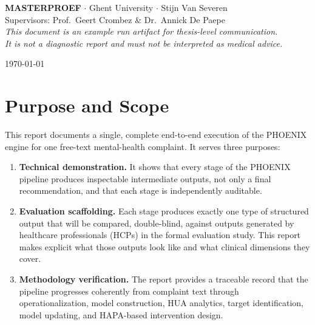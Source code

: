 \documentclass[11pt,a4paper]{article}
\begin{document}
\begin{titlepage}
\vfill
\begin{tcolorbox}[
  colback=PhoenixSoft,colframe=PhoenixBorder,
  width=0.78\textwidth,boxrule=0.5pt,arc=1.5mm,
  left=8pt,right=8pt,top=7pt,bottom=7pt
]
\small\centering
\textbf{MASTERPROEF} $\cdot$ Ghent University $\cdot$ Stijn Van Severen\\
Supervisors: Prof.\ Geert Crombez \& Dr.\ Annick De Paepe\\[0.3em]
\textit{This document is an example run artifact for thesis-level communication.\\
It is not a diagnostic report and must not be interpreted as medical advice.}
\end{tcolorbox}
\vspace{0.4cm}
{\large\today}
\end{titlepage}

\newpage
\tableofcontents
\newpage

\section{Purpose and Scope}

This report documents a single, complete end-to-end execution of the PHOENIX engine for one free-text mental-health complaint. It serves three purposes:

\begin{enumerate}
\item \textbf{Technical demonstration.} It shows that every stage of the PHOENIX pipeline produces inspectable intermediate outputs, not only a final recommendation, and that each stage is independently auditable.

\item \textbf{Evaluation scaffolding.} Each stage produces exactly one type of structured output that will be compared, double-blind, against outputs generated by healthcare professionals (HCPs) in the formal evaluation study. This report makes explicit what those outputs look like and what clinical dimensions they cover.

\item \textbf{Methodology verification.} The report provides a traceable record that the pipeline progresses coherently from complaint text through operationalization, model construction, HUA analytics, target identification, model updating, and HAPA-based intervention design.
\end{enumerate}
\end{document}
